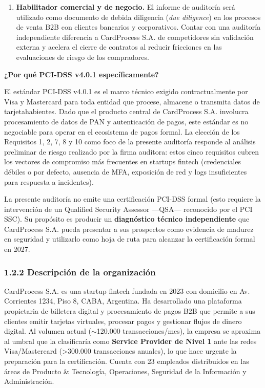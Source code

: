 \documentclass[11pt,a4paper]{article}
\begin{document}
\begin{enumerate}[leftmargin=*]
  \item \textbf{Habilitador comercial y de negocio.} El informe de auditoría será utilizado como documento de debida diligencia (\textit{due diligence}) en los procesos de venta B2B con clientes bancarios y corporativos. Contar con una auditoría independiente diferencia a CardProcess S.A. de competidores sin validación externa y acelera el cierre de contratos al reducir fricciones en las evaluaciones de riesgo de los compradores.
\end{enumerate}

\textbf{¿Por qué PCI-DSS v4.0.1 específicamente?}

El estándar PCI-DSS v4.0.1 es el marco técnico exigido contractualmente por Visa y Mastercard para toda entidad que procese, almacene o transmita datos de tarjetahabientes. Dado que el producto central de CardProcess S.A. involucra procesamiento de datos de PAN y autenticación de pagos, este estándar es no negociable para operar en el ecosistema de pagos formal. La elección de los Requisitos 1, 2, 7, 8 y 10 como foco de la presente auditoría responde al análisis preliminar de riesgo realizado por la firma auditora: estos cinco requisitos cubren los vectores de compromiso más frecuentes en startups fintech (credenciales débiles o por defecto, ausencia de MFA, exposición de red y logs insuficientes para respuesta a incidentes).

La presente auditoría no emite una certificación PCI-DSS formal (esto requiere la intervención de un Qualified Security Assessor —QSA— reconocido por el PCI SSC). Su propósito es producir un \textbf{diagnóstico técnico independiente} que CardProcess S.A. pueda presentar a sus prospectos como evidencia de madurez en seguridad y utilizarlo como hoja de ruta para alcanzar la certificación formal en 2027.

\subsubsection{1.2.2 Descripción de la organización}

CardProcess S.A. es una startup fintech fundada en 2023 con domicilio en Av. Corrientes 1234, Piso 8, CABA, Argentina. Ha desarrollado una plataforma propietaria de billetera digital y procesamiento de pagos B2B que permite a sus clientes emitir tarjetas virtuales, procesar pagos y gestionar flujos de dinero digital. Al volumen actual ($\sim$120.000 transacciones/mes), la empresa se aproxima al umbral que la clasificaría como \textbf{Service Provider de Nivel 1} ante las redes Visa/Mastercard (>300.000 transacciones anuales), lo que hace urgente la preparación para la certificación. Cuenta con 23 empleados distribuidos en las áreas de Producto \& Tecnología, Operaciones, Seguridad de la Información y Administración.
\end{document}
